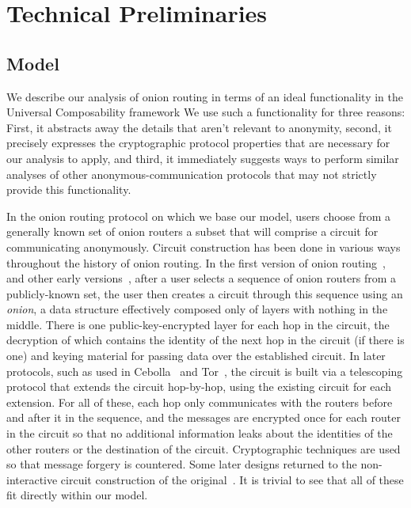 \documentclass[prodmode,acmtissec]{acmsmall}
\begin{document}
\section{Technical Preliminaries}
\subsection{Model}
We describe our analysis of onion routing in terms of an ideal functionality in the Universal Composability framework \cite{cryptoeprint:2000:067} 
We use such a functionality for
three reasons: First, it abstracts away the details that aren't relevant to anonymity,
second, it precisely expresses the cryptographic protocol properties that are necessary for our analysis to apply, and
third, it immediately suggests ways to perform similar
analyses of other anonymous-communication protocols that may not strictly provide this functionality.

In the onion routing protocol on which we base our model, users choose
from a generally known set of onion routers a subset that will
comprise a circuit for communicating anonymously.  Circuit
construction has been done in various ways throughout the history of
onion routing.  In the first version of onion
routing~\cite{onion-routing:ih96}, and other early
versions~\cite{onion-routing:jsac98,freedom1-arch}, after a user selects a
sequence of onion routers from a publicly-known set, the user then creates a
circuit through this sequence using an \emph{onion}, a data structure
effectively composed only of layers with nothing in the middle. There
is one public-key-encrypted layer for each hop in the circuit, the
decryption of which contains the identity of the next hop in the
circuit (if there is one) and keying material for passing data over
the established circuit. In later protocols, such as used in
Cebolla~\cite{cebolla} and Tor~\cite{tor-design}, the circuit is built
via a telescoping protocol that extends the circuit hop-by-hop, using
the existing circuit for each extension. For all of these, each hop
only communicates with the routers before and after it in the
sequence, and the messages are encrypted once for each router in the
circuit so that no additional information leaks about the identities
of the other routers or the destination of the circuit.
Cryptographic techniques are used so that message forgery is
countered. Some later designs returned to the non-interactive
circuit construction of the
original~\cite{overlier:pet2007,pairing:pet2007}. It is trivial to see
that all of these fit directly within our model.
\end{document}
